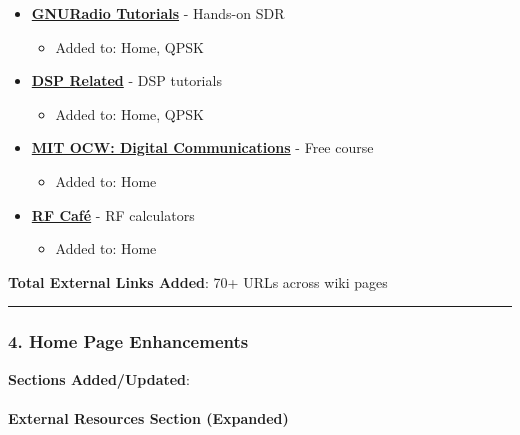 \begin{itemize}
\tightlist
\item
  \textbf{\href{https://wiki.gnuradio.org/index.php/Tutorials}{GNURadio
  Tutorials}} - Hands-on SDR

  \begin{itemize}
  \tightlist
  \item
    Added to: Home, QPSK
  \end{itemize}
\item
  \textbf{\href{https://www.dsprelated.com/}{DSP Related}} - DSP
  tutorials

  \begin{itemize}
  \tightlist
  \item
    Added to: Home, QPSK
  \end{itemize}
\item
  \textbf{\href{https://ocw.mit.edu/courses/6-450-principles-of-digital-communications-i-fall-2006/}{MIT
  OCW: Digital Communications}} - Free course

  \begin{itemize}
  \tightlist
  \item
    Added to: Home
  \end{itemize}
\item
  \textbf{\href{https://www.rfcafe.com/}{RF Café}} - RF calculators

  \begin{itemize}
  \tightlist
  \item
    Added to: Home
  \end{itemize}
\end{itemize}

\textbf{Total External Links Added}: 70+ URLs across wiki pages

\begin{center}\rule{0.5\linewidth}{0.5pt}\end{center}

\subsubsection{4. Home Page Enhancements}\label{home-page-enhancements}

\textbf{Sections Added/Updated}:

\paragraph{External Resources Section
(Expanded)}\label{external-resources-section-expanded}

